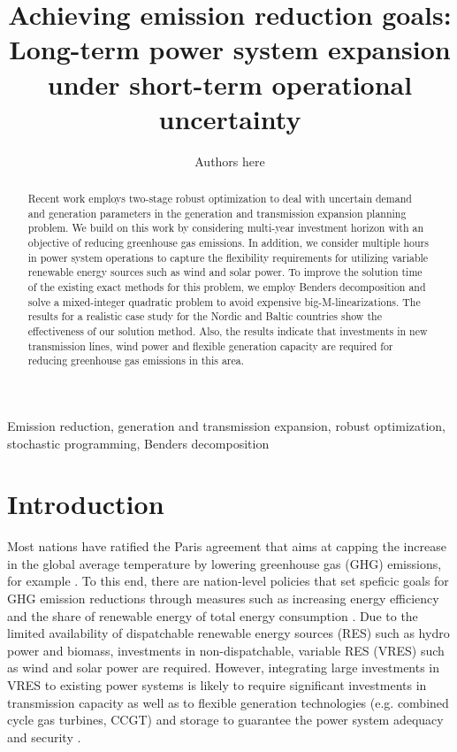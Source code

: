 \documentclass[final]{IEEEtran}
\begin{document}
\title{Achieving emission reduction goals: Long-term power system expansion under short-term operational uncertainty}
\author{Authors here}
\maketitle

\begin{abstract}
Recent work employs two-stage robust optimization to deal with uncertain demand and generation parameters in the generation and transmission expansion planning problem. We build on this work by considering multi-year investment horizon with an objective of reducing greenhouse gas emissions. In addition, we consider multiple hours in power system operations to capture the flexibility requirements for utilizing variable renewable energy sources such as wind and solar power. To improve the solution time of the existing exact methods for this problem, we employ Benders decomposition and solve a mixed-integer quadratic problem to avoid expensive big-M-linearizations. The results for a realistic case study for the Nordic and Baltic countries show the effectiveness of our solution method. Also, the results indicate that investments in new transmission lines, wind power and flexible generation capacity are required for reducing greenhouse gas emissions in this area.
\end{abstract}
\begin{IEEEkeywords}
Emission reduction, generation and transmission expansion, robust optimization, stochastic programming, Benders decomposition
\end{IEEEkeywords}

\section{Introduction}


Most nations have ratified the Paris agreement that aims at capping the increase in the global average temperature by lowering greenhouse gas (GHG) emissions, for example \cite{Paris_agreement}. To this end, there are nation-level policies that set speficic goals for GHG emission reductions through measures such as increasing energy efficiency and the share of renewable energy of total energy consumption \cite{EU_climate_action}. Due to the limited availability of dispatchable renewable energy sources (RES) such as hydro power and biomass, investments in non-dispatchable, variable RES (VRES) such as wind and solar power are required. However, integrating large investments in VRES to existing power systems is likely to require significant investments in transmission capacity as well as to flexible generation technologies (e.g. combined cycle gas turbines, CCGT) and storage to guarantee the power system adequacy and security \cite{Zappa}.
\end{document}
